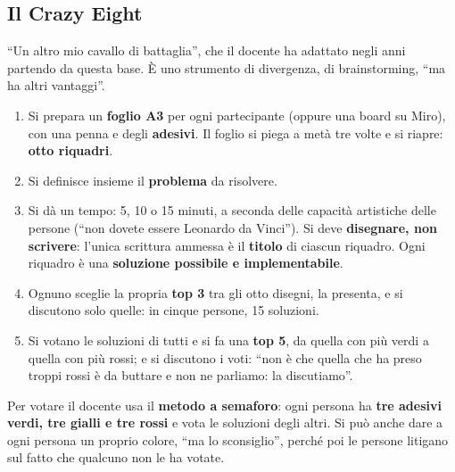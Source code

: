\subsection{Il Crazy Eight}



``Un altro mio cavallo di battaglia'', che il docente ha adattato negli anni partendo da
questa base. È uno strumento di divergenza, di brainstorming, ``ma ha altri vantaggi''.
\begin{enumerate}
  \item Si prepara un \textbf{foglio A3} per ogni partecipante (oppure una board su Miro),
        con una penna e degli \textbf{adesivi}. Il foglio si piega a metà tre volte e si
        riapre: \textbf{otto riquadri}.
  \item Si definisce insieme il \textbf{problema} da risolvere.
  \item Si dà un tempo: 5, 10 o 15 minuti, a seconda delle capacità artistiche delle
        persone (``non dovete essere Leonardo da Vinci''). Si deve \textbf{disegnare, non
        scrivere}: l'unica scrittura ammessa è il \textbf{titolo} di ciascun riquadro.
        Ogni riquadro è una \textbf{soluzione possibile e implementabile}.
  \item Ognuno sceglie la propria \textbf{top 3} tra gli otto disegni, la presenta, e si
        discutono solo quelle: in cinque persone, 15 soluzioni.
  \item Si votano le soluzioni di tutti e si fa una \textbf{top 5}, da quella con più
        verdi a quella con più rossi; e si discutono i voti: ``non è che quella che ha
        preso troppi rossi è da buttare e non ne parliamo: la discutiamo''.
\end{enumerate}
Per votare il docente usa il \textbf{metodo a semaforo}: ogni persona ha \textbf{tre
adesivi verdi, tre gialli e tre rossi} e vota le soluzioni degli altri. Si può anche dare a
ogni persona un proprio colore, ``ma lo sconsiglio'', perché poi le persone litigano sul
fatto che qualcuno non le ha votate.

